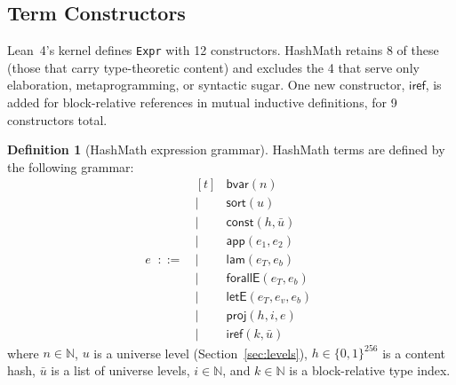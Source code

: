 \documentclass[11pt]{article}
\theoremstyle{definition}
\newtheorem{definition}{Definition}[section]
\theoremstyle{plain}
\theoremstyle{remark}
\newcommand{\bvar}{\textsf{bvar}}
\newcommand{\const}{\textsf{const}}
\newcommand{\app}{\textsf{app}}
\newcommand{\lam}{\textsf{lam}}
\newcommand{\forallE}{\textsf{forallE}}
\newcommand{\letE}{\textsf{letE}}
\newcommand{\proj}{\textsf{proj}}
\newcommand{\sort}{\textsf{sort}}
\begin{document}
\subsection{Term Constructors}
\label{sec:terms}

Lean~4's kernel defines \texttt{Expr} with 12 constructors.
HashMath retains 8 of these (those that carry type-theoretic content) and excludes the
4 that serve only elaboration, metaprogramming, or syntactic sugar.
One new constructor, $\textsf{iref}$, is added for block-relative references in mutual
inductive definitions, for 9 constructors total.

\begin{definition}[HashMath expression grammar]
\label{def:expr}
HashMath terms are defined by the following grammar:
\[
  e \;\;::=\;\;
    \begin{aligned}[t]
      &\bvar(n) \\
      \mid\;\; &\sort(u) \\
      \mid\;\; &\const(h, \bar{u}) \\
      \mid\;\; &\app(e_1, e_2) \\
      \mid\;\; &\lam(e_T, e_b) \\
      \mid\;\; &\forallE(e_T, e_b) \\
      \mid\;\; &\letE(e_T, e_v, e_b) \\
      \mid\;\; &\proj(h, i, e) \\
      \mid\;\; &\textsf{iref}(k, \bar{u})
    \end{aligned}
\]
where $n \in \mathbb{N}$, $u$ is a universe level (Section~\ref{sec:levels}),
$h \in \{0,1\}^{256}$ is a content hash, $\bar{u}$ is a list of universe levels,
$i \in \mathbb{N}$, and $k \in \mathbb{N}$ is a block-relative type index.
\end{definition}
\end{document}
